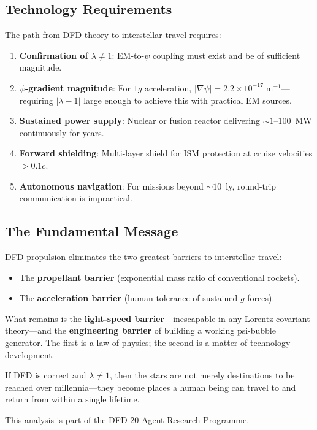 \documentclass[aps,prd,twocolumn,superscriptaddress,nofootinbib]{revtex4-2}
\newcommand{\ee}[1]{\times 10^{#1}}
\begin{document}
\subsection{Technology Requirements}

The path from DFD theory to interstellar travel requires:
\begin{enumerate}
\item \textbf{Confirmation of $\lambda \neq 1$}: EM-to-$\psi$ coupling
must exist and be of sufficient magnitude.
\item \textbf{$\psi$-gradient magnitude}: For $1g$ acceleration,
$|\nabla\psi| = 2.2\ee{-17}\;\text{m}^{-1}$---requiring
$|\lambda - 1|$ large enough to achieve this with practical
EM sources.
\item \textbf{Sustained power supply}: Nuclear or fusion reactor
delivering $\sim 1$--$100$~MW continuously for years.
\item \textbf{Forward shielding}: Multi-layer shield for ISM
protection at cruise velocities $> 0.1c$.
\item \textbf{Autonomous navigation}: For missions beyond $\sim 10$~ly,
round-trip communication is impractical.
\end{enumerate}

\subsection{The Fundamental Message}

DFD propulsion eliminates the two greatest barriers to interstellar
travel:
\begin{itemize}
\item The \textbf{propellant barrier} (exponential mass ratio of
conventional rockets).
\item The \textbf{acceleration barrier} (human tolerance of sustained
$g$-forces).
\end{itemize}

What remains is the \textbf{light-speed barrier}---inescapable in
any Lorentz-covariant theory---and the \textbf{engineering barrier}
of building a working psi-bubble generator.  The first is a law of
physics; the second is a matter of technology development.

If DFD is correct and $\lambda \neq 1$, then the stars are not merely
destinations to be reached over millennia---they become places a human
being can travel to and return from within a single lifetime.

\begin{acknowledgments}
This analysis is part of the DFD 20-Agent Research Programme.
\end{acknowledgments}
\end{document}
